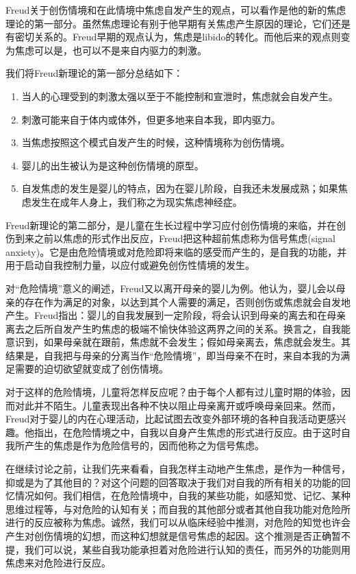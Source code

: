 \documentclass[UTF8,10pt,a4paper,openany]{book}
\begin{document}
Freud关于创伤情境和在此情境中焦虑自发产生的观点，可以看作是他的新的焦虑理论的第一部分。虽然焦虑理论有别于他早期有关焦虑产生原因的理论，它们还是有密切关系的。Freud早期的观点认为，焦虑是libido的转化。而他后来的观点则变为焦虑可以是，也可以不是来自内驱力的刺激。

我们将Freud新理论的第一部分总结如下：
\begin{enumerate}
    \item 当人的心理受到的刺激太强以至于不能控制和宣泄时，焦虑就会自发产生。
    \item 刺激可能来自于体内或体外，但更多地来自本我，即内驱力。
    \item 当焦虑按照这个模式自发产生的时候，这种情境称为创伤情境。
    \item 婴儿的出生被认为是这种创伤情境的原型。
    \item 自发焦虑的发生是婴儿的特点，因为在婴儿阶段，自我还未发展成熟；如果焦虑发生在成年人身上，我们称之为现实焦虑神经症。
\end{enumerate}

Freud新理论的第二部分，是儿童在生长过程中学习应付创伤情境的来临，并在创伤到来之前以焦虑的形式作出反应，Freud把这种超前焦虑称为信号焦虑(signal anxiety)。它是由危险情境或对危险即将来临的感受而产生的，是自我的功能，并用于启动自我控制力量，以应付或避免创伤性情境的发生。

对“危险情境”意义的阐述，Freud又以离开母亲的婴儿为例。他认为，婴儿会以母亲的存在作为满足的对象，以达到其个人需要的满足，否则创伤或焦虑就会自发地产生。Freud指出：婴儿的自我发展到一定阶段，将会认识到母亲的离去和在母亲离去之后所自发产生旳焦虑的极端不愉快体验这两界之间的关系。换言之，自我能意识到，如果母亲就在跟前，焦虑就不会发生；假如母亲离去，焦虑就会发生。其结果是，自我把与母亲的分离当作“危险情境”，即当母亲不在时，来自本我的为满足需要的迫切欲望就变成了创伤情境。

对于这样的危险情境，儿童将怎样反应呢？由于每个人都有过儿童时期的体验，因而对此并不陌生。儿童表现出各种不快以阻止母亲离开或呼唤母亲回来。然而，Freud对于婴儿的内在心理活动，比起试图去改变外部环境的各种自我活动更感兴趣。他指出，在危险情境之中，自我以自身产生焦虑的形式进行反应。由于这时自我所产生的焦虑是作为危险信号的，因而他称之为信号焦虑。

在继续讨论之前，让我们先来看看，自我怎样主动地产生焦虑，是作为一种信号，抑或是为了其他目的？对这个问题的回答取决于我们对自我的所有相关的功能的回忆情况如何。我们相信，在危险情境中，自我的某些功能，如感知觉、记忆、某种思维过程等，与对危险的认知有关；而自我的其他部分或者其他自我功能对危险所进行的反应被称为焦虑。诚然，我们可以从临床经验中推测，对危险的知觉也许会产生对创伤情境的幻想，而这种幻想就是信号焦虑的起因。这个推测是否正确暂不提，我们可以说，某些自我功能承担着对危险进行认知的责任，而另外的功能则用焦虑来对危险进行反应。
\end{document}
